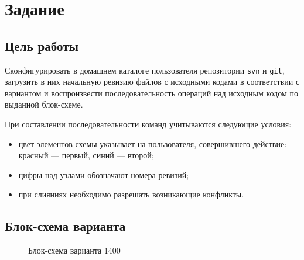 \documentclass[12pt]{article}
\newcommand{\commitnode}[4]{%
    \fill[#3] (#1,#2) circle (4.3pt);
    \node[font=\bfseries\scriptsize] at (#1,#2 + 0.42) {#4};
}
\begin{document}

\clearpage
{}
\tableofcontents
\newpage

\section{Задание}

\subsection{Цель работы}

Сконфигурировать в домашнем каталоге пользователя репозитории
\texttt{svn} и \texttt{git}, загрузить в них начальную ревизию файлов
с исходными кодами в соответствии с вариантом и воспроизвести
последовательность операций над исходным кодом по выданной блок-схеме.

При составлении последовательности команд учитываются следующие условия:

\begin{itemize}[leftmargin=1.5em]
    \item цвет элементов схемы указывает на пользователя,
    совершившего действие: красный --- первый, синий --- второй;
    \item цифры над узлами обозначают номера ревизий;
    \item при слияниях необходимо разрешать возникающие конфликты.
\end{itemize}

\subsection{Блок-схема варианта}

\begin{figure}[h]
    \centering
    \caption{Блок-схема варианта 1400}
\end{figure}
\end{document}
